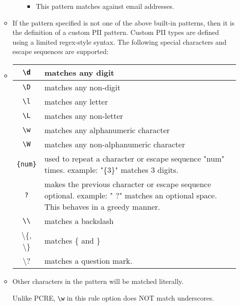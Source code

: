 \documentclass[english]{report}
\newenvironment{note}{
\samepage
    \vspace{10pt}{\textsf{
        {\hspace{7pt}\Huge{$\triangle$\hspace{-12.5pt}{\Large{$^!$}}}}\hspace{5pt}
        {\Large{NOTE}}
    }
    }
   \begin{center}
    \par\vspace{-17pt}

    \begin{lrbox}{\savepar}
    \begin{minipage}[r]{6in}
}
{
    \end{minipage}
    \end{lrbox}
    \fbox{
        \usebox{
            \savepar
	}
    }
    \par\vskip10pt
    \end{center}
}
\newenvironment{note}{
        \begin{rawhtml}
        <p><table border="1"><tr><td><b>
        Note:&nbsp;&nbsp;</b>
        \end{rawhtml}
}{
        \begin{rawhtml}
        </b></td></tr></table></p>
        \end{rawhtml}
}
\begin{document}
\begin{itemize}
\begin{itemize}
\begin{itemize}
\begin{itemize}
\item[] This pattern matches against email addresses.
\end{itemize}
\end{itemize}

\item[] If the pattern specified is not one of the above built-in patterns,
then it is the definition of a custom PII pattern. Custom PII types
are defined using a limited regex-style syntax. The following
special characters and escape sequences are supported:

\item[]
\begin{tabular}{|c|p{10cm}|}

\hline
\texttt{\textbackslash d} & matches any digit\\
\hline
\texttt{\textbackslash D} & matches any non-digit\\
\hline
\texttt{\textbackslash l} & matches any letter\\
\hline
\texttt{\textbackslash L} & matches any non-letter\\
\hline
\texttt{\textbackslash w} & matches any alphanumeric character\\
\hline
\texttt{\textbackslash W} & matches any non-alphanumeric character\\
\hline
\texttt{\{num\}} & used to repeat a character or escape sequence "num" times.
example:  "\d\{3\}" matches 3 digits.\\
\hline
\texttt{?} & makes the previous character or escape sequence optional.
example:  " ?" matches an optional space.
This behaves in a greedy manner.\\
\hline
\texttt{\textbackslash\textbackslash} & matches a backslash\\
\hline
\textbackslash \{, \textbackslash \} & matches \{ and \}\\
\hline
\textbackslash ? & matches a question mark.\\
\hline
\end{tabular}

\item[] Other characters in the pattern will be matched literally.

\begin{note}
Unlike PCRE, \texttt{\textbackslash w} in this rule option does NOT match underscores.
\end{note}
\end{itemize}


\end{itemize}
\end{document}
